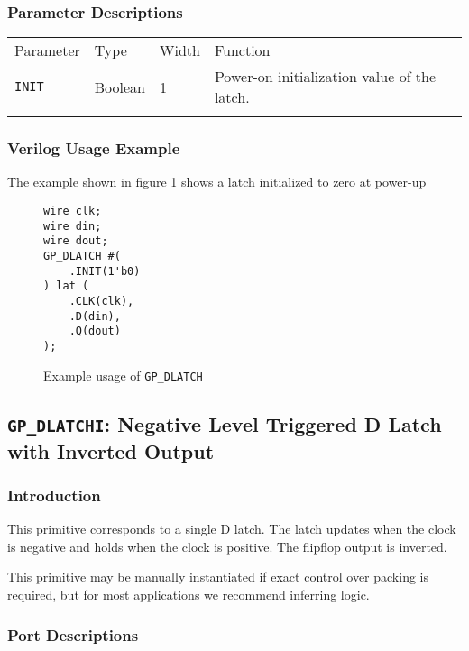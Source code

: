 \documentclass[11pt]{article}
\newcommand{\tokenstyle}[1]{\texttt{#1}}
\newcommand{\whenstyle}[1]{{\fontseries{sb}\selectfont#1}}
\newcommand{\thinhline}{\Xhline{1\arrayrulewidth}}
\newcommand{\thickhline}{\Xhline{2.5\arrayrulewidth}}
\begin{document}
\subsubsection{Parameter Descriptions}

\begin{tabularx}{\textwidth}{lllX}
\thinhline
\whenstyle{Parameter} & \whenstyle{Type} & \whenstyle{Width} & \whenstyle{Function} \\
\thickhline
\tokenstyle{INIT} & Boolean & 1 & Power-on initialization value of the latch.\\
\thinhline
\end{tabularx}

\subsubsection{Verilog Usage Example}

The example shown in figure \ref{gp-dlatch-example} shows a latch initialized to zero at power-up

\begin{figure}[h]
\begin{lstlisting}
wire clk;
wire din;
wire dout;
GP_DLATCH #(
	.INIT(1'b0)
) lat (
	.CLK(clk),
	.D(din),
	.Q(dout)
);
\end{lstlisting}
\caption{Example usage of \tokenstyle{GP\_DLATCH}}
\label{gp-dlatch-example}
\end{figure}


\pagebreak
\subsection{\tokenstyle{GP\_DLATCHI}: Negative Level Triggered D Latch with Inverted Output}
\label{gp-latchi}

\subsubsection{Introduction}
This primitive corresponds to a single D latch. The latch updates when the clock is negative and holds
when the clock is positive. The flipflop output is inverted.

This primitive may be manually instantiated if exact control over packing is required, but for most applications we
recommend inferring logic.

\subsubsection{Port Descriptions}
\end{document}

